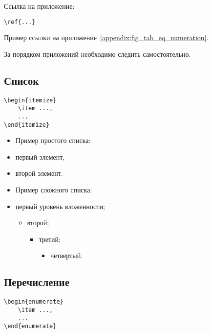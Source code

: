 \documentclass[14pt, a4paper, titlepage]{extarticle}
\begin{document}
Ссылка на приложение:
\begin{verbatim}
\ref{...}
\end{verbatim}

Пример ссылки на приложение~\ref{appendix:fig_tab_eq_numeration}.

За порядком приложений необходимо следить самостоятельно.

\subsection{Список}

\begin{verbatim}
\begin{itemize}
    \item ...,
    ...
\end{itemize}
\end{verbatim}

\begin{itemize}
    \item[] Пример простого списка:
    \item первый элемент,
    \item второй элемент.
\end{itemize}

\begin{itemize}
    \item[] Пример сложного списка:
    \item первый уровень вложенности;
    \begin{itemize}
        \item второй;
        \begin{itemize}
            \item третий;
            \begin{itemize}
                \item четвертый.
            \end{itemize}
        \end{itemize}
    \end{itemize}
\end{itemize}

\subsection{Перечисление}

\begin{verbatim}
\begin{enumerate}
    \item ...,
    ...
\end{enumerate} 
\end{verbatim}
\end{document}
